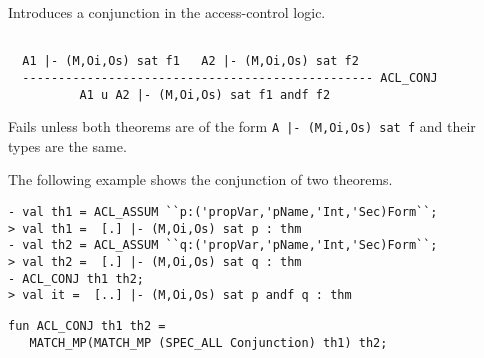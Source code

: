 


\egroup

\SYNOPSIS
Introduces a conjunction in the access-control logic.

\DESCRIBE
\begin{verbatim}

  A1 |- (M,Oi,Os) sat f1   A2 |- (M,Oi,Os) sat f2
  ------------------------------------------------- ACL_CONJ
          A1 u A2 |- (M,Oi,Os) sat f1 andf f2
\end{verbatim}

\FAILURE 
Fails unless both theorems are of the form \texttt{A |- (M,Oi,Os) sat
f} and their types are the same.  

\EXAMPLE
The following example shows the conjunction of two theorems.
\begin{holboxed}
\begin{verbatim}
- val th1 = ACL_ASSUM ``p:('propVar,'pName,'Int,'Sec)Form``;
> val th1 =  [.] |- (M,Oi,Os) sat p : thm
- val th2 = ACL_ASSUM ``q:('propVar,'pName,'Int,'Sec)Form``;
> val th2 =  [.] |- (M,Oi,Os) sat q : thm
- ACL_CONJ th1 th2;
> val it =  [..] |- (M,Oi,Os) sat p andf q : thm
\end{verbatim}
\end{holboxed}


\IMPLEMENTATION
\begin{holboxed}
\begin{verbatim}
fun ACL_CONJ th1 th2 = 
   MATCH_MP(MATCH_MP (SPEC_ALL Conjunction) th1) th2;
\end{verbatim}
\end{holboxed}

